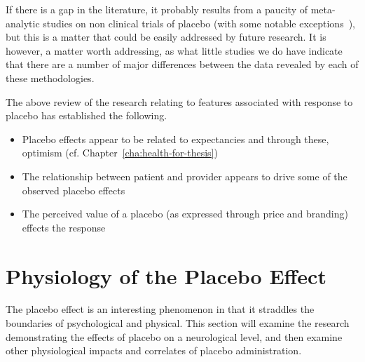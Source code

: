 If there is a gap in the literature, it probably results from a paucity of meta-analytic studies on non clinical trials of placebo (with some notable exceptions~\cite{Wampol2007,Vase2002}), but this is a matter that could be easily addressed by future research. It is however, a matter worth addressing, as what little studies we do have indicate that there are a number of major differences between the data revealed by each of these methodologies. 

The above review of the  research relating to features associated with response to placebo has established the following. 
\begin{itemize}
\item Placebo effects appear to be related to expectancies and through these, optimism (cf. Chapter~\ref{cha:health-for-thesis})
\item The relationship between patient and provider appears to drive some of the observed placebo effects
\item The perceived value of a placebo (as expressed through price and branding) effects the response
\end{itemize}




\section{Physiology of the Placebo Effect}
\label{sec:neur-plac-effect}


The placebo effect is an interesting phenomenon in that it straddles the boundaries of psychological and physical. This section will examine the research demonstrating the effects of placebo on a neurological level, and then examine other physiological impacts and correlates of placebo administration. 



